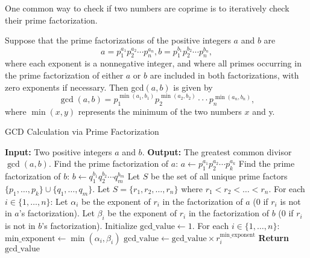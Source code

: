 \documentclass[oneside]{book}
\begin{document}
One common way to check if two numbers are coprime is to iteratively check their prime factorization.

Suppose that the prime factorizations of the positive integers $a$ and
$b$ are $$a=p_1^{a_1}p_2^{a_2}\cdots p_n^{a_n},b=p_1^{b_1}p_2^{b_2}\cdots p_n^{b_n},
$$
where each exponent is a nonnegative integer, and where all primes occurring in the prime factorization of either
$a$ or $b$ are included in both factorizations, with zero exponents if necessary. Then gcd$(a, b)$ is given by
$$\gcd(a,b)=p_1^{\min(a_1,b_1)}p_2^{\min(a_2,b_2)}\cdotp\cdotp\cdotp p_n^{\min(a_n,b_n)},$$
where $\min(x,y)$ represents the minimum of the two numbers $x$ and y.


\begin{algorithm}[H]
	\caption{GCD Calculation via Prime Factorization}
	\label{alg:gcd_prime_factorization_pseudocode}
	\begin{algorithmic}[1]
		\State \textbf{Input:} Two positive integers $a$ and $b$.
		\State \textbf{Output:} The greatest common divisor $\gcd(a, b)$.
		\State
		\State Find the prime factorization of $a$: $a \gets p_1^{a_1} p_2^{a_2} \cdots p_k^{a_k}$
		\State Find the prime factorization of $b$: $b \gets q_1^{b_1} q_2^{b_2} \cdots q_m^{b_m}$
		\State
		\State Let $S$ be the set of all unique prime factors $\{p_1, \dots, p_k\} \cup \{q_1, \dots, q_m\}$.
		\State Let $S = \{r_1, r_2, \dots, r_n\}$ where $r_1 < r_2 < \dots < r_n$.
		\State
		\State For each $i \in \{1, \dots, n\}$:
		\State \quad Let $\alpha_i$ be the exponent of $r_i$ in the factorization of $a$ (0 if $r_i$ is not in $a$'s factorization).
		\State \quad Let $\beta_i$ be the exponent of $r_i$ in the factorization of $b$ (0 if $r_i$ is not in $b$'s factorization).
		\State
		\State Initialize $\text{gcd\_value} \gets 1$.
		\State For each $i \in \{1, \dots, n\}$:
		\State \quad $\text{min\_exponent} \gets \min(\alpha_i, \beta_i)$
		\State \quad $\text{gcd\_value} \gets \text{gcd\_value} \times r_i^{\text{min\_exponent}}$
		\State
		\State \textbf{Return} $\text{gcd\_value}$
		\EndProcedure
	\end{algorithmic}
\end{algorithm}
\end{document}
